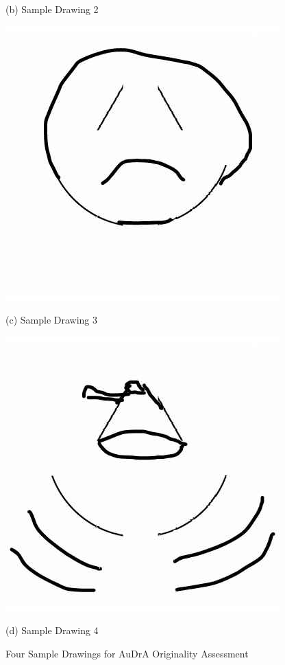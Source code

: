 \documentclass[../Proposal_Writing_Sample.tex]{subfiles}
\begin{document}
\begin{figure}[]
\begin{minipage}{0.45\textwidth}
        \caption*{(b) Sample Drawing 2}
    \end{minipage}
    \vspace{0.5cm}
    \begin{minipage}{0.45\textwidth}
        \centering
        \includegraphics[width=\linewidth]{sample_drawing_AuDrA/example3.jpg}
        \caption*{(c) Sample Drawing 3}
    \end{minipage}\hfill
    \begin{minipage}{0.45\textwidth}
        \centering
        \includegraphics[width=\linewidth]{sample_drawing_AuDrA/example4.jpg}
        \caption*{(d) Sample Drawing 4}
    \end{minipage}
    \caption{Four Sample Drawings for AuDrA Originality Assessment}
    \label{fig: sample_drawing_AuDrA}
\end{figure}
\end{document}
